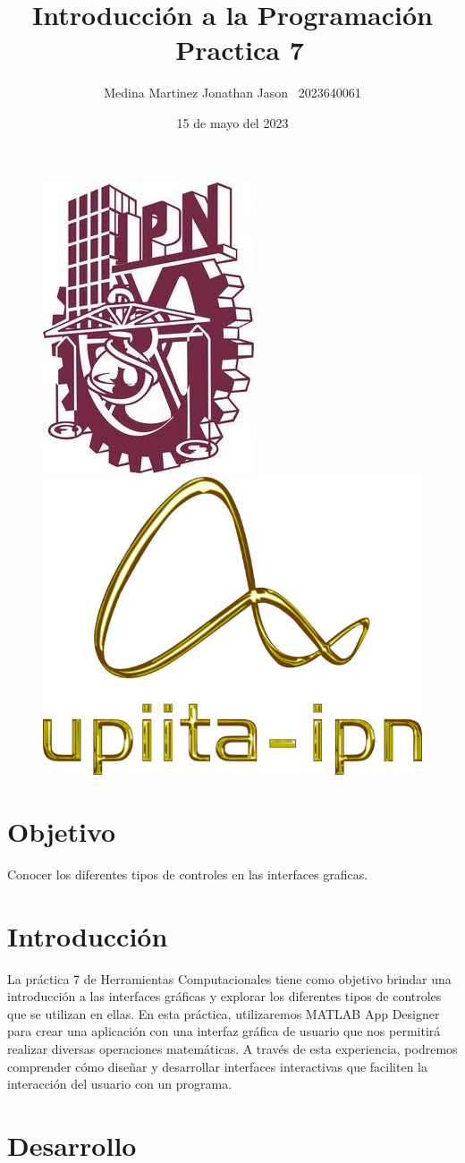 \documentclass{article}
\title{Introducción a la Programación \ Practica 7}
\author{Medina Martinez Jonathan Jason \ 2023640061}
\date{15 de mayo del 2023}
\begin{document}
	
	\fontsize{12}{16}\selectfont
	
	\begin{figure}[t]
		
		\includegraphics[width=2.5 cm]{Logo1.jpeg}
		\hfill
		\includegraphics[width=3 cm]{Logo2.png}
		
	\end{figure}
	
	\maketitle
	\newpage
	
	\tableofcontents
	\newpage
	
	\section{Objetivo}
	
	Conocer los diferentes tipos de controles en las interfaces graficas.
	
	\section{Introducción}
	
	La práctica 7 de Herramientas Computacionales tiene como objetivo brindar una introducción a las interfaces gráficas y explorar los diferentes tipos de controles que se utilizan en ellas. En esta práctica, utilizaremos MATLAB App Designer para crear una aplicación con una interfaz gráfica de usuario que nos permitirá realizar diversas operaciones matemáticas. A través de esta experiencia, podremos comprender cómo diseñar y desarrollar interfaces interactivas que faciliten la interacción del usuario con un programa.
	
	\newpage
	\section{Desarrollo}
	
\end{document}
